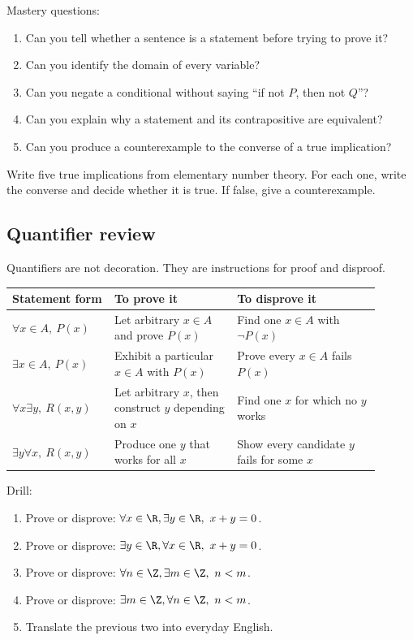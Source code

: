 Mastery questions:

\begin{enumerate}
\item Can you tell whether a sentence is a statement before trying to prove it?
\item Can you identify the domain of every variable?
\item Can you negate a conditional without saying ``if not $P$, then not $Q$''?
\item Can you explain why a statement and its contrapositive are equivalent?
\item Can you produce a counterexample to the converse of a true implication?
\end{enumerate}

\begin{labbox}
Write five true implications from elementary number theory. For each one, write the converse and decide whether it is true. If false, give a counterexample.
\end{labbox}

\subsection{Quantifier review}

Quantifiers are not decoration. They are instructions for proof and disproof.

\begin{longtable}{p{0.25\linewidth}p{0.3\linewidth}p{0.35\linewidth}}
\toprule
Statement form & To prove it & To disprove it \\
\midrule
$\forall x\in A,\ P(x)$ & Let arbitrary $x\in A$ and prove $P(x)$ & Find one $x\in A$ with $\neg P(x)$ \\
$\exists x\in A,\ P(x)$ & Exhibit a particular $x\in A$ with $P(x)$ & Prove every $x\in A$ fails $P(x)$ \\
$\forall x\exists y,\ R(x,y)$ & Let arbitrary $x$, then construct $y$ depending on $x$ & Find one $x$ for which no $y$ works \\
$\exists y\forall x,\ R(x,y)$ & Produce one $y$ that works for all $x$ & Show every candidate $y$ fails for some $x$ \\
\bottomrule
\end{longtable}

Drill:

\begin{enumerate}
\item Prove or disprove: $\forall x\in\R,\exists y\in\R,\ x+y=0$.
\item Prove or disprove: $\exists y\in\R,\forall x\in\R,\ x+y=0$.
\item Prove or disprove: $\forall n\in\Z,\exists m\in\Z,\ n< m$.
\item Prove or disprove: $\exists m\in\Z,\forall n\in\Z,\ n<m$.
\item Translate the previous two into everyday English.
\end{enumerate}

